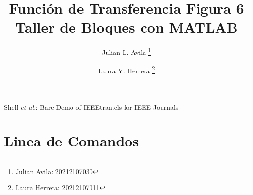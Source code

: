 \documentclass[journal, onecolumn]{IEEEtran}
\begin{document}
\title{Función de Transferencia Figura 6 \\ Taller de Bloques con MATLAB}

\author[*]{Julian L. Avila
    \thanks{Julian Avila: 20212107030}}
\author[*]{Laura Y. Herrera
    \thanks{Laura Herrera: 20212107011}}


\markboth{}
{Shell \MakeLowercase{\textit{et al.}}: Bare Demo of IEEEtran.cls for IEEE Journals}

\maketitle
\section{Linea de Comandos}
\end{document}
